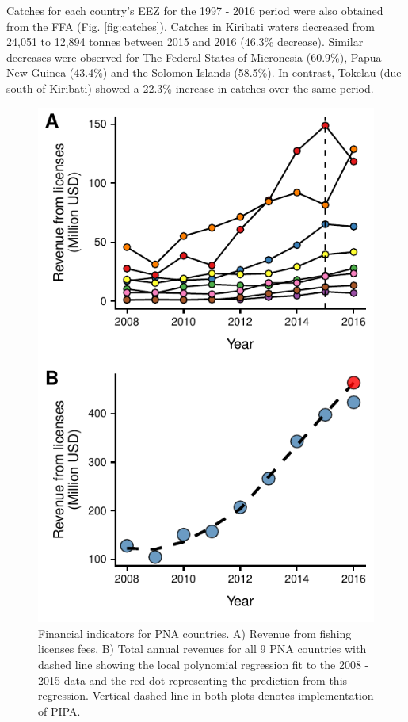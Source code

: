 \documentclass[9p,twocolumn,twoside,lineno]{pnas-new}
\begin{document}
Catches for each country's EEZ for the 1997 - 2016 period were also obtained from the FFA (Fig. \ref{fig:catches}). Catches in Kiribati waters decreased from 24,051 to 12,894 tonnes between 2015 and 2016 (46.3\% decrease). Similar decreases were observed for The Federal States of Micronesia (60.9\%), Papua New Guinea (43.4\%) and the Solomon Islands (58.5\%). In contrast, Tokelau (due south of Kiribati) showed a 22.3\% increase in catches over the same period.

\begin{figure}[ht]
\centering
	\includegraphics{img/revenues.pdf}
	\caption{\label{fig:revenues}Financial indicators for PNA countries. A) Revenue from fishing licenses fees, B) Total annual revenues for all 9 PNA countries with dashed line showing the local polynomial regression fit to the 2008 - 2015 data and the red dot representing the prediction from this regression. Vertical dashed line in both plots denotes implementation of PIPA.}
\end{figure}
\end{document}

